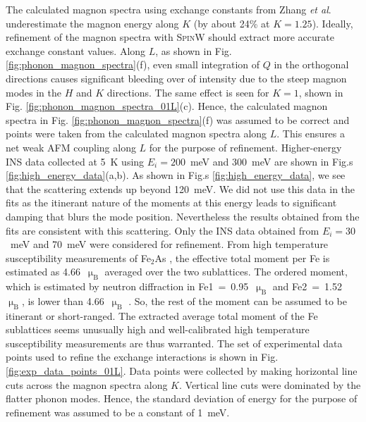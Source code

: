 \documentclass[10pt,doublespacing,edeposit]{uiucthesis2020}
\begin{document}
\begin{mainmatter}
The calculated magnon spectra using exchange constants from Zhang \emph{et al}. \cite{Zhang2013} underestimate the magnon energy along $K$ (by about 24\% at $K = 1.25$).
Ideally, refinement of the magnon spectra with \textsc{SpinW} \cite{Toth_2015} should extract more accurate exchange constant values.
Along $L$, as shown in Fig. \ref{fig:phonon_magnon_spectra}(f), even small integration of $Q$ in the orthogonal directions causes significant bleeding over of intensity due to the steep magnon modes in the $H$ and $K$ directions. The same effect is seen for $K = 1$, shown in Fig. \ref{fig:phonon_magnon_spectra_01L}(c).
Hence, the calculated magnon spectra in Fig. \ref{fig:phonon_magnon_spectra}(f) was assumed to be correct and points were taken from the calculated magnon spectra along $L$. This ensures a net weak AFM coupling along $L$ for the purpose of refinement.
Higher-energy INS data collected at 5~K using $E_i=200$~meV and 300~meV are shown in Fig.s \ref{fig:high_energy_data}(a,b). As shown in Fig.s \ref{fig:high_energy_data}, we see that the scattering extends up beyond 120~meV. We did not use this data in the fits as the itinerant nature of the moments at this energy leads to significant damping that blurs the mode position.  Nevertheless the results obtained from the fits are consistent with this scattering. Only the INS data obtained from $E_i=30$~meV and 70~meV  were considered for refinement.
From high temperature susceptibility measurements of Fe$_2$As \cite{Katsuraki1966}, the effective total moment per Fe is estimated as 4.66~$\upmu_\text{B}$ averaged over the two sublattices. The ordered moment, which is estimated by neutron diffraction in Fe1~=~0.95~$\upmu_\text{B}$ and Fe2~=~1.52~$\upmu_\text{B}$, is lower than 4.66~$\upmu_\text{B}$ \cite{Katsuraki1966,Zhang2013}. So, the rest of the moment can be assumed to be itinerant or short-ranged. The extracted average total moment of the Fe sublattices seems unusually high and well-calibrated high temperature susceptibility measurements are thus warranted.
The set of experimental data points used to refine the exchange interactions is shown in Fig. \ref{fig:exp_data_points_01L}. Data points were collected by making horizontal line cuts across the magnon spectra along $K$. Vertical line cuts were dominated by the flatter phonon modes. Hence, the standard deviation of energy for the purpose of refinement was assumed to be a constant of 1~meV.



\end{mainmatter}
\end{document}
